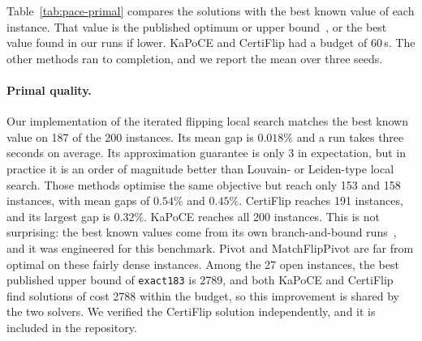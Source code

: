 Table~\ref{tab:pace-primal} compares the solutions with the best known value
of each instance.  That value is the published optimum or upper
bound~\citep{BlasiusEtAl22sea}, or the best value found in our runs if lower.
KaPoCE and CertiFlip had a budget of $60$\,s.  The other methods ran to
completion, and we report the mean over three seeds.

\begin{table}[!tbp]
\centering
\caption{PACE 2021 exact track (200 instances): primal quality.  ``Hit''
counts instances on which the best of the runs matches the best known value;
the gap is the relative excess of the mean cost over the best known value.}
\label{tab:pace-primal}

\end{table}

\paragraph{Primal quality.}  Our implementation of the iterated flipping local
search matches the best known value on 187 of the 200 instances.  Its mean gap
is $0.018\%$ and a run takes three seconds on average.  Its approximation
guarantee is only $3$ in expectation, but in practice it is an order of
magnitude better than Louvain- or Leiden-type local search.  Those methods
optimise the same objective but reach only 153 and 158 instances, with mean
gaps of $0.54\%$ and $0.45\%$.  CertiFlip reaches 191 instances, and its
largest gap is $0.32\%$.  KaPoCE reaches all 200 instances.  This is not
surprising: the best known values come from its own branch-and-bound
runs~\citep{BlasiusEtAl22sea}, and it was engineered for this benchmark.
Pivot and MatchFlipPivot are far from optimal on these fairly dense
instances.  Among the 27 open instances, the best published upper bound of
\texttt{exact183} is 2789, and both KaPoCE and CertiFlip find solutions of
cost 2788 within the budget, so this improvement is shared by the two solvers.
We verified the CertiFlip solution independently, and it is included in the
repository.

\begin{table}[!tbp]
\centering
\caption{PACE 2021 exact track: lower bounds on the 173 instances with known
optimum.  The last two rows are the root bounds of the KaPoCE
branch-and-bound as published by its authors.  ``LB $=$ OPT'' counts the
instances whose bound proves optimality.}
\label{tab:pace-bounds}

\end{table}


